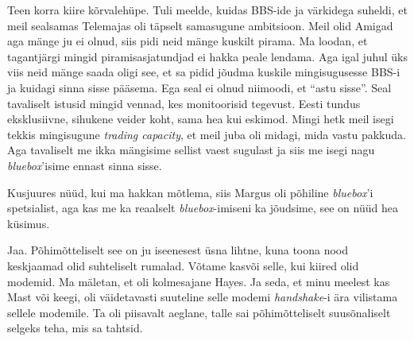 Teen korra kiire kõrvalehüpe. Tuli meelde, kuidas BBS-ide ja värkidega suheldi, 
et meil sealsamas Telemajas oli täpselt samasugune ambitsioon. Meil olid Amigad 
aga mänge ju ei olnud, siis pidi neid mänge kuskilt pirama. Ma loodan, et 
tagantjärgi mingid piramisasjatundjad ei hakka peale lendama. Aga igal juhul 
üks viis neid mänge saada oligi see, et sa pidid jõudma kuskile mingisugusesse 
BBS-i ja kuidagi sinna sisse pääsema. Ega seal ei olnud niimoodi, et 
\enquote{astu sisse}. Seal tavaliselt istusid mingid vennad, kes monitoorisid 
tegevust. Eesti tundus eksklusiivne, sihukene veider koht, sama hea kui 
eskimod. Mingi hetk meil isegi tekkis mingisugune \emph{trading capacity}, et 
meil juba oli midagi, mida  vastu pakkuda. Aga tavaliselt me ikka mängisime 
sellist vaest sugulast ja siis me isegi nagu 
\emph{bluebox}'isime ennast sinna sisse. 


Kusjuures nüüd, kui ma hakkan mõtlema, siis Margus 
oli põhiline \emph{bluebox}'i spetsialist, aga kas me ka reaalselt 
\emph{bluebox}-imiseni ka jõudsime, see on nüüd hea küsimus.


Jaa. Põhimõtteliselt see on ju iseenesest üsna lihtne, kuna toona nood 
keskjaamad olid suhteliselt rumalad.  Võtame kasvõi selle, kui kiired olid 
modemid. Ma mäletan, et oli kolmesajane Hayes. Ja seda, et minu meelest kas 
Mast või keegi, oli väidetavasti suuteline selle modemi 
\emph{handshake}-i ära vilistama sellele modemile. Ta  oli  piisavalt aeglane, 
talle sai põhimõtteliselt suusõnaliselt selgeks teha, mis sa tahtsid.

